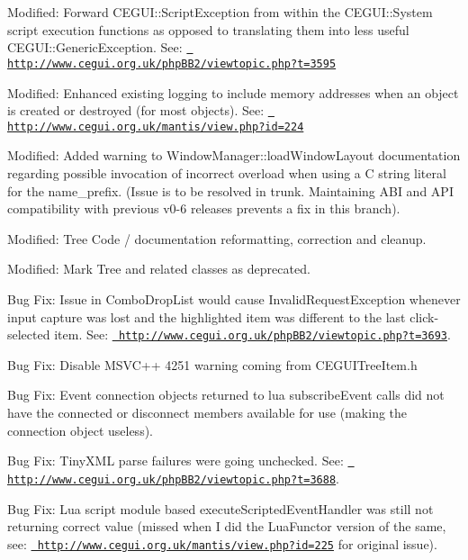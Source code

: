 \begin{DoxyItemize}
\item Modified\+: Forward C\+E\+G\+U\+I\+::\+Script\+Exception from within the C\+E\+G\+U\+I\+::\+System script execution functions as opposed to translating them into less useful C\+E\+G\+U\+I\+::\+Generic\+Exception. See\+: \href{http://www.cegui.org.uk/phpBB2/viewtopic.php?t=3595}{\texttt{ http\+://www.\+cegui.\+org.\+uk/php\+B\+B2/viewtopic.\+php?t=3595}}
\item Modified\+: Enhanced existing logging to include memory addresses when an object is created or destroyed (for most objects). See\+: \href{http://www.cegui.org.uk/mantis/view.php?id=224}{\texttt{ http\+://www.\+cegui.\+org.\+uk/mantis/view.\+php?id=224}}
\item Modified\+: Added warning to Window\+Manager\+::load\+Window\+Layout documentation regarding possible invocation of incorrect overload when using a C string literal for the \textquotesingle{}name\+\_\+prefix\textquotesingle{}. (Issue is to be resolved in trunk. Maintaining A\+BI and A\+PI compatibility with previous v0-\/6 releases prevents a fix in this branch).
\item Modified\+: Tree Code / documentation reformatting, correction and cleanup.
\item Modified\+: Mark Tree and related classes as deprecated.
\item Bug Fix\+: Issue in Combo\+Drop\+List would cause Invalid\+Request\+Exception whenever input capture was lost and the highlighted item was different to the last click-\/selected item. See\+: \href{http://www.cegui.org.uk/phpBB2/viewtopic.php?t=3693}{\texttt{ http\+://www.\+cegui.\+org.\+uk/php\+B\+B2/viewtopic.\+php?t=3693}}.
\item Bug Fix\+: Disable M\+S\+V\+C++ 4251 warning coming from C\+E\+G\+U\+I\+Tree\+Item.\+h
\item Bug Fix\+: Event connection objects returned to lua subscribe\+Event calls did not have the connected or disconnect members available for use (making the connection object useless).
\item Bug Fix\+: Tiny\+X\+ML parse failures were going unchecked. See\+: \href{http://www.cegui.org.uk/phpBB2/viewtopic.php?t=3688}{\texttt{ http\+://www.\+cegui.\+org.\+uk/php\+B\+B2/viewtopic.\+php?t=3688}}.
\item Bug Fix\+: Lua script module based \textquotesingle{}execute\+Scripted\+Event\+Handler was still not returning correct value (missed when I did the Lua\+Functor version of the same, see\+: \href{http://www.cegui.org.uk/mantis/view.php?id=225}{\texttt{ http\+://www.\+cegui.\+org.\+uk/mantis/view.\+php?id=225}} for original issue).

\end{DoxyItemize}
